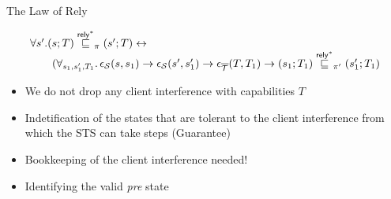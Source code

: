 \documentclass[aspectratio=169,xcolor=dvipsnames]{beamer}
\begin{document}
\begin{frame}{The Law of Rely}\scriptsize
 \begin{theorem}\scriptsize
            \[
            \begin{array}{l}\forall s' .   (s;T) \overset{\mathsf{rely}^{*}}{\sqsubseteq}_{\pi}  (s';T) \leftrightarrow \\
           \quad\quad  (\forall_{s_1,s_1',T_1} \ldotp \epsilon_{\mathcal{S}}(s ,s_1) \rightarrow \epsilon_{\mathcal{S}}(s',s'_1) \rightarrow \epsilon_{\overline{\mathcal{T}}}(T,T_1) \rightarrow ( s_1; T_1) \overset{\mathsf{rely}^{*}}{\sqsubseteq}_{\pi'} (s'_1; T_1)
            \end{array}
           \]
     \end{theorem}
     \begin{itemize}
         \item We do not drop any client interference with capabilities $T$
         \item Indetification of the states that are tolerant to the client interference from which the STS can take steps (Guarantee)
         \item Bookkeeping of the client interference needed!  
         \item Identifying the valid \emph{pre} state
     \end{itemize}
\end{frame}
\end{document}
